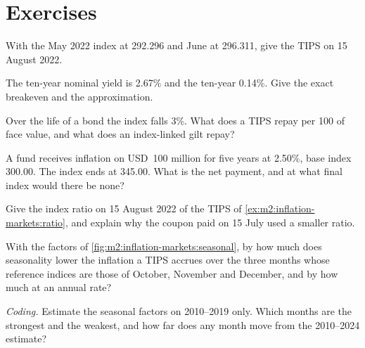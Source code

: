 \section{Exercises}

\begin{exercise}[$\star$]\label{exo:m2:inflation-markets:1}
With the May 2022 index at 292.296 and June at 296.311, give the TIPS
 on 15 August 2022.
\end{exercise}

\begin{exercise}[$\star$]\label{exo:m2:inflation-markets:2}
The ten-year nominal yield is 2.67\% and the ten-year  0.14\%. Give
the exact breakeven and the approximation.
\end{exercise}

\begin{exercise}[$\star$]\label{exo:m2:inflation-markets:3}
Over the life of a bond the index falls 3\%. What does a TIPS repay per 100 of
face value, and what does an index-linked gilt repay?
\end{exercise}

\begin{exercise}[$\star\star$]\label{exo:m2:inflation-markets:4}
A fund receives inflation on USD~100 million for five years at 2.50\%, base
index 300.00. The index ends at 345.00. What is the net payment, and at what
final index would there be none?
\end{exercise}

\begin{exercise}[$\star\star$]\label{exo:m2:inflation-markets:5}
Give the index ratio on 15 August 2022 of the TIPS of
\cref{ex:m2:inflation-markets:ratio}, and explain why the coupon paid on 15
July used a smaller ratio.
\end{exercise}

\begin{exercise}[$\star\star$]\label{exo:m2:inflation-markets:6}
With the factors of \cref{fig:m2:inflation-markets:seasonal}, by how much does
seasonality lower the inflation a TIPS accrues over the three months whose
reference indices are those of October, November and December, and by how much
at an annual rate?
\end{exercise}

\begin{exercise}[$\star\star\star$]\label{exo:m2:inflation-markets:7}
\emph{Coding.} Estimate the seasonal factors on 2010--2019 only. Which months
are the strongest and the weakest, and how far does any month move from the
2010--2024 estimate?
\end{exercise}

